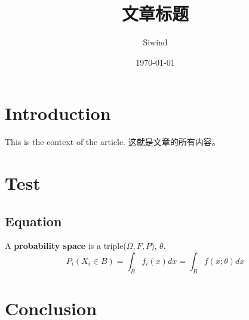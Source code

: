 \documentclass[UTF8]{ctexart}
\title{文章标题}
\author{Siwind}
\date{\today}
\begin{document}
\maketitle
\tableofcontents

\newpage
\section{Introduction}

This is the context of the article.
这就是文章的所有内容。
\section{Test}
\subsection{Equation}

A \textbf{probability space} is a triple($\Omega,F, P $), $\theta$.
\begin{equation}
	P_i(X_i \in B )=\int_{B}f_i(x)dx = \int_{B}f(x;\theta)dx
\end{equation}


\section{Conclusion}
\end{document}
